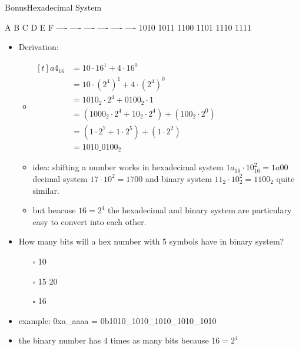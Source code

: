 \begin{frame}{Bonus}{Hexadecimal System}
\begin{terminal}
  A    B    C    D    E    F
  ---- ---- ---- ---- ---- ----
  1010 1011 1100 1101 1110 1111
  \end{terminal}
  \begin{itemize}
    \item \alert{Derivation:}
    \begin{itemize}
      \item $\begin{aligned}[t]
          a4_{16} &= 10 \cdot 16^1 + 4 \cdot 16^0 \\
                  &= 10 \cdot {(2^4)}^1 + 4 \cdot {(2^4)}^0 \\
                  &= 1010_2 \cdot 2^4 + 0100_2 \cdot 1 \\
                  &= (1000_2 \cdot 2^4 + 10_2 \cdot 2^4) + (100_2 \cdot 2^0) \\
                  &= (1 \cdot 2^7 + 1 \cdot 2^5) + (1 \cdot 2^2) \\
                  &= 1010\_0100_{2}
        \end{aligned}$
      \item \alert{idea:} shifting a number works in hexadecimal system $1a_{16} \cdot 10^2_{16} = 1a00$ decimal system $17 \cdot 10^2 = 1700$ and binary system $11_2 \cdot 10_2^2 = 1100_2$ quite similar.
      \item but beacuse $16 = 2^4$ the \alert{hexadecimal} and \alert{binary system} are particulary easy to convert into each other.
    \end{itemize}
  \end{itemize}
\end{frame}

\begin{frame}
  \begin{itemize}
    \item How many bits will a hex number with 5 symbols have in binary system?
      \begin{itemize}
        \item[$\square$] 10
        \item[$\square$] 15
         20
        \item[$\square$] 16
      \end{itemize}
    \item<2>\alert{example:} 0xa\_aaaa = 0b1010\_1010\_1010\_1010\_1010
    \item<2>the \alert{binary number} has $4$ times as many bits because $16=2^4$
  \end{itemize}
\end{frame}
